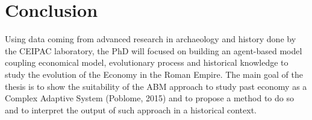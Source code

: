 \documentclass[a4paper]{article}
\begin{document}
\section{Conclusion}

Using data coming from advanced research in archaeology and history done by the CEIPAC laboratory, the PhD will focused on building an agent-based model coupling economical model, evolutionary process and historical knowledge to study the evolution of the Economy in the Roman Empire. The main goal of the thesis is to show the suitability of the ABM approach to study past economy as a Complex Adaptive System (Poblome, 2015) and to propose a method to do so and to interpret the output of such approach in a historical context.




  
\end{document}
